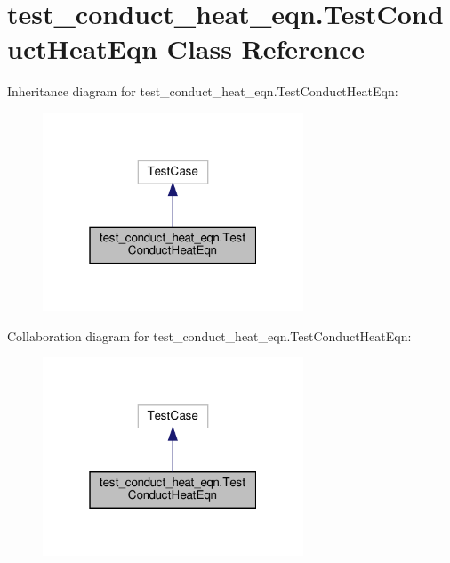 \hypertarget{classtest__conduct__heat__eqn_1_1TestConductHeatEqn}{}\section{test\+\_\+conduct\+\_\+heat\+\_\+eqn.\+Test\+Conduct\+Heat\+Eqn Class Reference}
\label{classtest__conduct__heat__eqn_1_1TestConductHeatEqn}


Inheritance diagram for test\+\_\+conduct\+\_\+heat\+\_\+eqn.\+Test\+Conduct\+Heat\+Eqn\+:
\nopagebreak
\begin{figure}[H]
\begin{center}
\leavevmode
\includegraphics[width=220pt]{classtest__conduct__heat__eqn_1_1TestConductHeatEqn__inherit__graph}
\end{center}
\end{figure}


Collaboration diagram for test\+\_\+conduct\+\_\+heat\+\_\+eqn.\+Test\+Conduct\+Heat\+Eqn\+:
\nopagebreak
\begin{figure}[H]
\begin{center}
\leavevmode
\includegraphics[width=220pt]{classtest__conduct__heat__eqn_1_1TestConductHeatEqn__coll__graph}
\end{center}
\end{figure}
